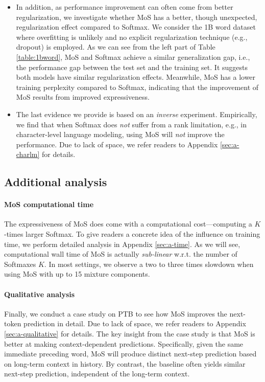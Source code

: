 \begin{itemize}[leftmargin=*,label=$\bullet$]
\item 
In addition, as performance improvement can often come from better regularization, we investigate whether MoS has a better, though unexpected, regularization effect compared to Softmax.
We consider the 1B word dataset where overfitting is unlikely and no explicit regularization technique (e.g., dropout) is employed.
As we can see from the left part of Table \ref{table:1bword}, MoS and Softmax achieve a similar generalization gap, i.e., the performance gap between the test set and the training set.
It suggests both models have similar regularization effects.
Meanwhile, MoS has a lower training perplexity compared to Softmax, indicating that the improvement of MoS results from improved expressiveness.

\item 
The last evidence we provide is based on an \textit{inverse} experiment. Empirically, we find that when Softmax does \textit{not} suffer from a rank limitation, e.g., in character-level language modeling, using MoS will \textit{not} improve the performance.
Due to lack of space, we refer readers to Appendix \ref{sec:a-charlm} for details.

\end{itemize}

\subsection{Additional analysis}
\paragraph{MoS computational time} 
The expressiveness of MoS does come with a computational cost---computing a $K$-times larger Softmax. To give readers a concrete idea of the influence on training time, we perform detailed analysis in Appendix \ref{sec:a-time}. As we will see, computational wall time of MoS is actually \textit{sub-linear} w.r.t. the number of Softmaxes $K$. In most settings, we observe a two to three times slowdown when using MoS with up to 15 mixture components.

\paragraph{Qualitative analysis}
Finally, we conduct a case study on PTB to see how MoS improves the next-token prediction in detail. Due to lack of space, we refer readers to Appendix \ref{sec:a-qualitative} for details. 
The key insight from the case study is that MoS is better at making context-dependent predictions. Specifically, given the same immediate preceding word, MoS will produce distinct next-step prediction based on long-term context in history. By contrast, the baseline often yields similar next-step prediction, independent of the long-term context.


